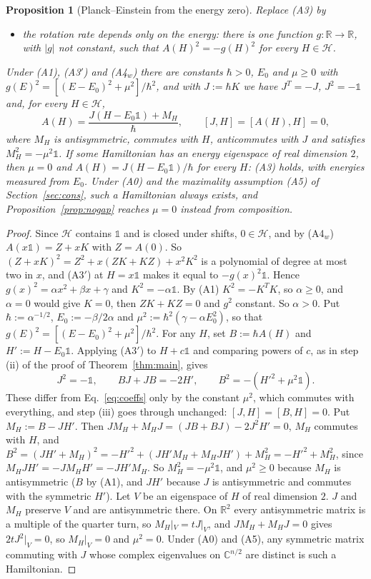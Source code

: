 \documentclass[11pt]{article}
\newtheorem{proposition}[theorem]{Proposition}
\theoremstyle{remark}
\newcommand{\R}{\mathbb{R}}
\newcommand{\C}{\mathbb{C}}
\newcommand{\one}{\mathbb{1}}
\begin{document}
\begin{proposition}[Planck--Einstein from the energy zero]\label{prop:pe}
Replace (A3) by
\begin{itemize}
\item[(A3$'$)] the rotation rate depends only on the energy: there is one function $g:\R\to\R$, with $|g|$ not constant, such that $A(H)^2=-g(H)^2$ for every $H\in\mathcal{H}$.
\end{itemize}
Under (A1), (A3$'$) and (A4$_w$) there are constants $\hbar>0$, $E_0$ and $\mu\ge0$ with $g(E)^2=[(E-E_0)^2+\mu^2]/\hbar^2$, and with $J:=\hbar K$ we have $J^T=-J$, $J^2=-\one$ and, for every $H\in\mathcal{H}$,
\begin{equation}\label{eq:gap}
A(H)=\frac{J(H-E_0\one)+M_H}{\hbar},\qquad [J,H]=[A(H),H]=0,
\end{equation}
where $M_H$ is antisymmetric, commutes with $H$, anticommutes with $J$ and satisfies $M_H^2=-\mu^2\one$. If some Hamiltonian has an energy eigenspace of real dimension $2$, then $\mu=0$ and $A(H)=J(H-E_0\one)/\hbar$ for every $H$: (A3) holds, with energies measured from $E_0$. Under (A0) and the maximality assumption (A5) of Section~\ref{sec:cons}, such a Hamiltonian always exists, and Proposition~\ref{prop:nogap} reaches $\mu=0$ instead from composition.
\end{proposition}

\begin{proof}
Since $\mathcal{H}$ contains $\one$ and is closed under shifts, $0\in\mathcal{H}$, and by (A4$_w$) $A(x\one)=Z+xK$ with $Z=A(0)$. So $(Z+xK)^2=Z^2+x(ZK+KZ)+x^2K^2$ is a polynomial of degree at most two in $x$, and (A3$'$) at $H=x\one$ makes it equal to $-g(x)^2\one$. Hence $g(x)^2=\alpha x^2+\beta x+\gamma$ and $K^2=-\alpha\one$. By (A1) $K^2=-K^TK$, so $\alpha\ge0$, and $\alpha=0$ would give $K=0$, then $ZK+KZ=0$ and $g^2$ constant. So $\alpha>0$. Put $\hbar:=\alpha^{-1/2}$, $E_0:=-\beta/2\alpha$ and $\mu^2:=\hbar^2(\gamma-\alpha E_0^2)$, so that $g(E)^2=[(E-E_0)^2+\mu^2]/\hbar^2$. For any $H$, set $B:=\hbar A(H)$ and $H':=H-E_0\one$. Applying (A3$'$) to $H+c\one$ and comparing powers of $c$, as in step (ii) of the proof of Theorem~\ref{thm:main}, gives
\[
J^2=-\one,\qquad BJ+JB=-2H',\qquad B^2=-(H'^2+\mu^2\one).
\]
These differ from Eq.~\eqref{eq:coeffs} only by the constant $\mu^2$, which commutes with everything, and step (iii) goes through unchanged: $[J,H]=[B,H]=0$. Put $M_H:=B-JH'$. Then $JM_H+M_HJ=(JB+BJ)-2J^2H'=0$, $M_H$ commutes with $H$, and $B^2=(JH'+M_H)^2=-H'^2+(JH'M_H+M_HJH')+M_H^2=-H'^2+M_H^2$, since $M_HJH'=-JM_HH'=-JH'M_H$. So $M_H^2=-\mu^2\one$, and $\mu^2\ge0$ because $M_H$ is antisymmetric ($B$ by (A1), and $JH'$ because $J$ is antisymmetric and commutes with the symmetric $H'$). Let $V$ be an eigenspace of $H$ of real dimension $2$. $J$ and $M_H$ preserve $V$ and are antisymmetric there. On $\R^2$ every antisymmetric matrix is a multiple of the quarter turn, so $M_H|_V=tJ|_V$, and $JM_H+M_HJ=0$ gives $2tJ^2|_V=0$, so $M_H|_V=0$ and $\mu^2=0$. Under (A0) and (A5), any symmetric matrix commuting with $J$ whose complex eigenvalues on $\C^{n/2}$ are distinct is such a Hamiltonian.
\end{proof}
\end{document}

